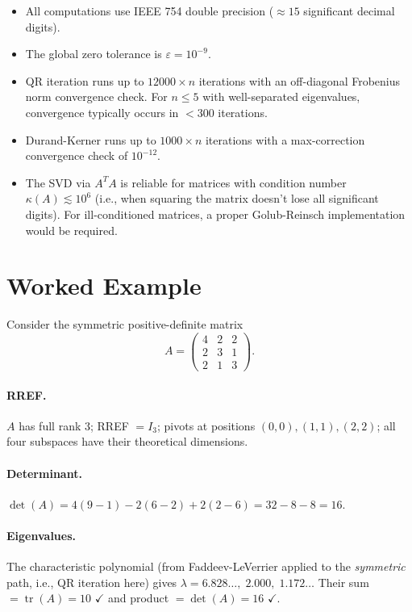 \documentclass[12pt, a4paper]{article}
\newcommand{\trace}{\operatorname{tr}}
\begin{document}
\begin{itemize}[noitemsep]
  \item All computations use IEEE 754 double precision ($\approx 15$
        significant decimal digits).
  \item The global zero tolerance is $\varepsilon = 10^{-9}$.
  \item QR iteration runs up to $12000 \times n$ iterations with an off-diagonal
        Frobenius norm convergence check.  For $n \leq 5$ with well-separated
        eigenvalues, convergence typically occurs in $< 300$ iterations.
  \item Durand-Kerner runs up to $1000 \times n$ iterations with a
        max-correction convergence check of $10^{-12}$.
  \item The SVD via $A^TA$ is reliable for matrices with condition number
        $\kappa(A) \lesssim 10^6$ (i.e., when squaring the matrix doesn't lose
        all significant digits).  For ill-conditioned matrices, a proper
        Golub-Reinsch implementation would be required.
\end{itemize}

\section{Worked Example}

Consider the symmetric positive-definite matrix
\[
  A = \begin{pmatrix} 4 & 2 & 2 \\ 2 & 3 & 1 \\ 2 & 1 & 3 \end{pmatrix}.
\]

\paragraph{RREF.} $A$ has full rank 3; RREF $= I_3$; pivots at positions
$(0,0), (1,1), (2,2)$; all four subspaces have their theoretical dimensions.

\paragraph{Determinant.} $\det(A) = 4(9-1) - 2(6-2) + 2(2-6) = 32 - 8 - 8 = 16$.

\paragraph{Eigenvalues.} The characteristic polynomial (from Faddeev-LeVerrier
applied to the \emph{symmetric} path, i.e., QR iteration here) gives
$\lambda = 6.828\ldots,\; 2.000,\; 1.172\ldots$
Their sum $= \trace(A) = 10$ $\checkmark$ and product $= \det(A) = 16$ $\checkmark$.
\end{document}
